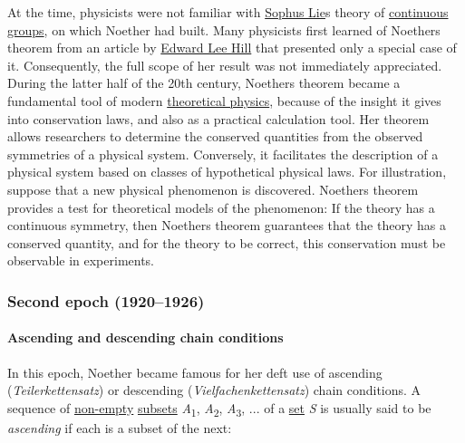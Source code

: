 At the time, physicists were not familiar with \href{https://en.wikipedia.org/wiki/Sophus_Lie}{Sophus Lie}\textquotesingle s theory of \href{https://en.wikipedia.org/wiki/Lie_group}{continuous groups}, on which Noether had built. Many physicists first learned of Noether\textquotesingle s theorem from an article by \href{https://en.wikipedia.org/wiki/Edward_Lee_Hill?action=edit&redlink=1}{Edward Lee Hill} that presented only a special case of it. Consequently, the full scope of her result was not immediately appreciated. During the latter half of the 20th century, Noether\textquotesingle s theorem became a fundamental tool of modern \href{https://en.wikipedia.org/wiki/Theoretical_physics}{theoretical physics}, because of the insight it gives into conservation laws, and also as a practical calculation tool. Her theorem allows researchers to determine the conserved quantities from the observed symmetries of a physical system. Conversely, it facilitates the description of a physical system based on classes of hypothetical physical laws. For illustration, suppose that a new physical phenomenon is discovered. Noether\textquotesingle s theorem provides a test for theoretical models of the phenomenon: If the theory has a continuous symmetry, then Noether\textquotesingle s theorem guarantees that the theory has a conserved quantity, and for the theory to be correct, this conservation must be observable in experiments.


\subsubsection[Second epoch (1920--1926)]{\texorpdfstring{\protect\hypertarget{Second_epoch_.281920.E2.80.931926.29}{}{}Second epoch (1920--1926)}{Second epoch (1920--1926)}}\label{Second_epoch_ux281920ux20131926ux29}


\paragraph{Ascending and descending chain conditions}\label{Ascending_and_descending_chain_conditions}

In this epoch, Noether became famous for her deft use of ascending (\emph{Teilerkettensatz}) or descending (\emph{Vielfachenkettensatz}) chain conditions. A sequence of \href{https://en.wikipedia.org/wiki/Non-empty}{non-empty} \href{https://en.wikipedia.org/wiki/Subset}{subsets} {\emph{A}\textsubscript{1}, \emph{A}\textsubscript{2}, \emph{A}\textsubscript{3}}, ... of a \href{https://en.wikipedia.org/wiki/Set_(mathematics)}{set} {\emph{S}} is usually said to be \emph{ascending} if each is a subset of the next:


